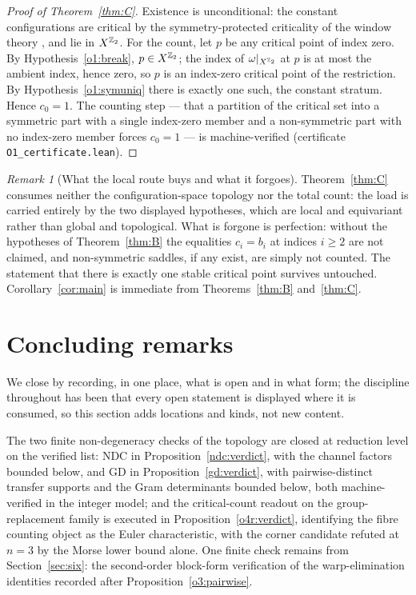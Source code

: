 \documentclass[11pt]{article}
\numberwithin{equation}{section}
\theoremstyle{plain}
\theoremstyle{definition}
\theoremstyle{remark}
\newtheorem{remark}[theorem]{Remark}
\begin{document}
\begin{proof}[Proof of Theorem~\textup{\ref{thm:C}}]
Existence is unconditional: the constant configurations are
critical by the symmetry-protected criticality of the window theory
\cite{MEF3}, and lie in $X^{\mathbb{Z}_2}$. For the count, let $p$ be any
critical point of index zero. By Hypothesis~\ref{o1:break},
$p \in X^{\mathbb{Z}_2}$; the index of $\omega|_{X^{\mathbb{Z}_2}}$ at $p$ is at
most the ambient index, hence zero, so $p$ is an index-zero
critical point of the restriction. By
Hypothesis~\ref{o1:symuniq} there is exactly one such, the constant
stratum. Hence $c_{0} = 1$. The counting step --- that a partition
of the critical set into a symmetric part with a single index-zero
member and a non-symmetric part with no index-zero member forces
$c_{0} = 1$ --- is machine-verified (certificate
\texttt{O1\_certificate.lean}).
\end{proof}

\begin{remark}[What the local route buys and what it
forgoes]\label{o1:scope}
Theorem~\ref{thm:C} consumes neither the configuration-space
topology nor the total count: the load is carried entirely by the
two displayed hypotheses, which are local and equivariant rather
than global and topological. What is forgone is perfection: without
the hypotheses of Theorem~\ref{thm:B} the equalities
$c_{i} = b_{i}$ at indices $i \geq 2$ are not claimed, and
non-symmetric saddles, if any exist, are simply not counted. The
statement that there is exactly one stable critical point survives
untouched. Corollary~\ref{cor:main} is immediate from
Theorems~\ref{thm:B} and~\ref{thm:C}.
\end{remark}

\section{Concluding remarks}\label{sec:outlook}

We close by recording, in one place, what is open and in what form;
the discipline throughout has been that every open statement is
displayed where it is consumed, so this section adds locations and
kinds, not new content.

The two finite non-degeneracy checks of the topology are closed at
reduction level on the verified list: NDC in
Proposition~\ref{ndc:verdict}, with the channel factors bounded
below, and GD in Proposition~\ref{gd:verdict}, with
pairwise-distinct transfer supports and the Gram determinants
bounded below, both machine-verified in the integer model; and the
critical-count readout on the group-replacement family is executed
in Proposition~\ref{o4r:verdict}, identifying the fibre counting
object as the Euler characteristic, with the corner candidate
refuted at $n = 3$ by the Morse lower bound alone. One finite check
remains from Section~\ref{sec:six}: the second-order block-form
verification of the warp-elimination identities recorded after
Proposition~\ref{o3:pairwise}.
\end{document}
